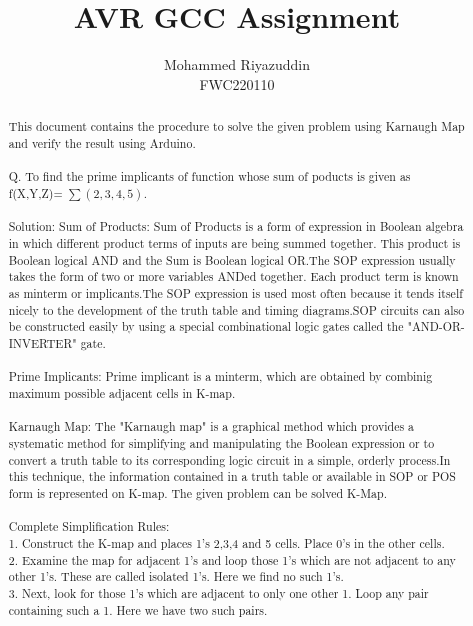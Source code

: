 \documentclass{IEEEtran}
\begin{document}
\title{AVR GCC Assignment}
\author{Mohammed Riyazuddin 
\\ FWC220110}
 \maketitle
 \begin{abstract}
  This document contains the procedure to solve the given problem using Karnaugh Map and verify the result using Arduino.
  \\
  \\Q. To find the prime implicants of function whose sum of poducts is given as f(X,Y,Z)= $\sum (2,3,4,5) $.
 \\
 \\Solution: 
Sum of Products: Sum of Products is a form of expression in Boolean algebra in which different product terms of inputs are being summed together. This product is Boolean logical AND and the Sum is Boolean logical OR.The SOP expression usually takes the form of two or more variables ANDed together. Each product term is known as minterm or implicants.The SOP expression is used most often because it tends itself nicely to the development of the truth table and timing diagrams.SOP circuits can also be constructed easily by using a special combinational logic gates called the "AND-OR-INVERTER" gate.
\\    
\\Prime Implicants: Prime implicant is a minterm, which are obtained by combinig maximum possible adjacent cells in K-map.
\\
\\ Karnaugh Map: The "Karnaugh map" is a graphical method which provides a systematic method for simplifying and manipulating the Boolean expression or to convert a truth table to its corresponding logic circuit in a simple, orderly process.In this technique, the information contained in a truth table or available in SOP or POS form is represented on K-map. The given problem can be solved K-Map.
\\ 
\\ Complete Simplification Rules:
\\1. Construct the K-map and places 1's 2,3,4 and 5 cells. Place 0's in the other cells.
\\2. Examine the map for adjacent 1's and loop those 1's which are not adjacent to any other 1's. These are called isolated 1's. Here we find no such 1's.
 \\3. Next, look for those 1's which are adjacent to only one other 1. Loop any pair containing such a 1. Here we have two such pairs.

\end{abstract}
\end{document}
